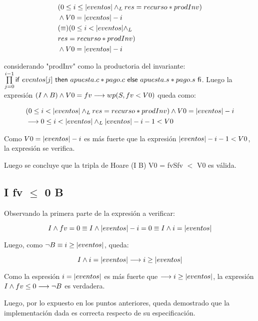 \documentclass[10pt,a4paper]{article}
\begin{document}
 \begin{equation}
	\begin{split}
		& (0 \leq i \leq \longitud{eventos} \yLuego res = recurso * prodInv)\\
		& \land V0 = \longitud{eventos} - i\\

		& (\equiv) (0 \leq i < \longitud{eventos} \yLuego\\
		& res = recurso * prodInv)\\
		& \land V0 = \longitud{eventos} - i
	\end{split}
	\end{equation}
 
 considerando "prodInv" como la productoria del invariante: $\prod\limits_{j=0}^{i-1} \mathsf{if}\ eventos[j]\ \mathsf{then}\ apuesta.c * pago.c\ \mathsf{else}\ apuesta.s * pago.s\ \mathsf{fi}$.
 Luego la expresión $(I \land B) \land V0 = fv \longrightarrow wp(S,fv < V0)$ queda como:

\begin{equation}
\begin{split}
	& (0 \leq i < |eventos| \land _L res = recurso * prodInv) \land V0 = |eventos| - i\\
	& \longrightarrow 0 \leq i < |eventos| \land _L |eventos| -i - 1 < V0
\end{split}
\end{equation}

 Como $V0 = |eventos| - i$ es más fuerte que la expresión $|eventos| -i - 1 < V0$, la expresión se verifica.

\vspace{0.3cm}

 Luego se concluye que la tripla de Hoare {(I \land B) \land V0 = fv}S{fv $<$ V0} es válida.

\subsection{I \land fv $\leq$ 0 \implica \neg B}

 Observando la primera parte de la expresión a verificar:
 
\begin{equation}
	I \land fv=0 \equiv I \land |eventos| - i = 0 \equiv I \land i = |eventos|
\end{equation}

 Luego, como $\neg B \equiv i \geq |eventos|$, queda:

\begin{equation}
	I \land i = |eventos| \longrightarrow i \geq |eventos|
\end{equation}

 Como la espresión $i = |eventos|$ es más fuerte que $\longrightarrow i \geq |eventos|$,
 la expresión $I \land fv \leq 0 \longrightarrow \neg B$ es verdadera.

 Luego, por lo expuesto en los puntos anteriores, queda demostrado que la implementación dada es correcta respecto de su especificación.
\end{document}
